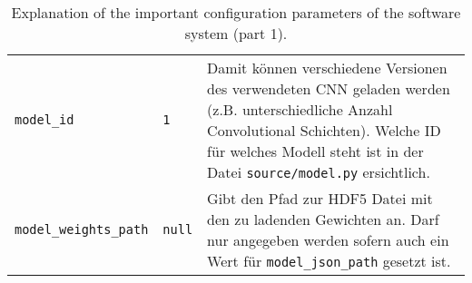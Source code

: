 \begin{table}[H]
\begin{adjustbox}{max width=\textwidth, max height=\textheight}
\begin{tabular}{llp{10cm}}
			\texttt{model{\_}id} & \texttt{1} & Damit können verschiedene Versionen des verwendeten CNN geladen werden (z.B. unterschiedliche Anzahl Convolutional Schichten). Welche ID für welches Modell steht ist in der Datei \texttt{source/model.py} ersichtlich.\\
			\texttt{model{\_}weights{\_}path} & \texttt{null} & Gibt den Pfad zur HDF5 Datei mit den zu ladenden Gewichten an. Darf nur angegeben werden sofern auch ein Wert für \texttt{model{\_}json{\_}path} gesetzt ist.\\
			\bottomrule
		\end{tabular}
	\end{adjustbox}
	\caption{Explanation of the important configuration parameters of the software system (part 1).}
\end{table}

\clearpage

